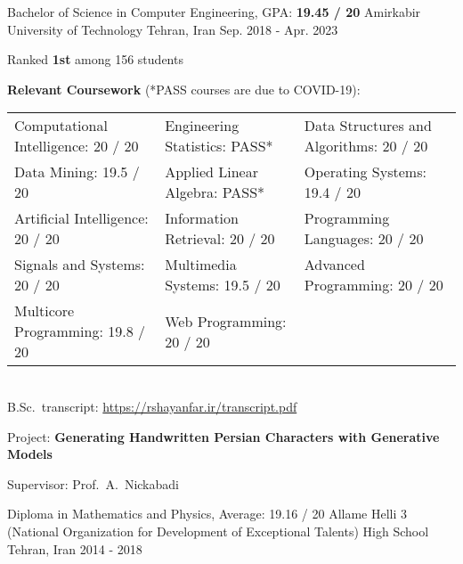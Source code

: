 \begin{cventries}
  \cventry
    {Bachelor of Science in Computer Engineering, GPA: \textbf{19.45 / 20}} %
    {Amirkabir University of Technology} %
    {Tehran, Iran} %
    {Sep. 2018 - Apr. 2023} %
    {
      \begin{cvitems}
        \item{Ranked \textbf{1st} among 156 students}
        \item{
          \textbf{Relevant Coursework} (*PASS courses are due to COVID-19):
          \smallskip
          \begin{adjustwidth}{4mm}{}
            \begin{tabular}{l@{\hskip 5mm}l@{\hskip 5mm}l}
              Computational Intelligence: 20 / 20 & Engineering Statistics: PASS*  & Data Structures and Algorithms: 20 / 20 \\
Data Mining: 19.5 / 20              & Applied Linear Algebra: PASS*  & Operating Systems: 19.4 / 20            \\
Artificial Intelligence: 20 / 20    & Information Retrieval: 20 / 20 & Programming Languages: 20 / 20          \\
Signals and Systems: 20 / 20        & Multimedia Systems: 19.5 / 20  & Advanced Programming: 20 / 20           \\
Multicore Programming: 19.8 / 20    & Web Programming: 20 / 20       &                                        
            \end{tabular}
            \\[2mm]
          	\textcolor{awesome-skyblue}{B.Sc.~transcript: \href{https://rshayanfar.ir/transcript.pdf}{https://rshayanfar.ir/transcript.pdf}}
          	\medskip
          \end{adjustwidth}
        }
        \item{
          Project: \textbf{Generating Handwritten Persian Characters with Generative Models}
        }
        \item{
          Supervisor: Prof.~A.~Nickabadi
        }
      \end{cvitems}
    }

  \cventry
    {Diploma in Mathematics and Physics, Average: 19.16 / 20} %
    {{\fontsize{9.8pt}{1em}\bodyfont Allame Helli 3 (National Organization for Development of Exceptional Talents) High School}}
    {Tehran, Iran} %
    {2014 - 2018} %
    {} \vspace*{-5mm}

\end{cventries}
